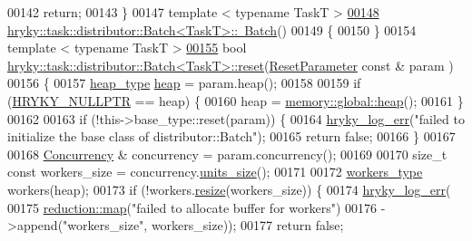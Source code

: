 \begin{DoxyCode}
00142     \textcolor{keywordflow}{return};
00143 \}
00147 \textcolor{keyword}{template} < \textcolor{keyword}{typename} TaskT >
\hypertarget{task__distributor__batch_8h_source_l00148}{}\hyperlink{group__task_ga80bd5c0c04972878c21bd5eda4c7d4e7}{00148} \hyperlink{classhryky_1_1task_1_1distributor_1_1_batch}{hryky::task::distributor::Batch<TaskT>::~Batch}()
00149 \{
00150 \}
00154 \textcolor{keyword}{template} < \textcolor{keyword}{typename} TaskT >
\hypertarget{task__distributor__batch_8h_source_l00155}{}\hyperlink{group__task_ga9ebf9038e6e40f583b3b26866e1f8131}{00155} \textcolor{keywordtype}{bool} \hyperlink{classhryky_1_1task_1_1distributor_1_1_batch}{hryky::task::distributor::Batch<TaskT>::reset}(\hyperlink{structhryky_1_1task_1_1distributor_1_1_base_1_1_reset_parameter}{ResetParameter} \textcolor{keyword}{const} & param
      )
00156 \{
00157     \hyperlink{classhryky_1_1memory_1_1heap_1_1_base}{heap_type} \hyperlink{namespacehryky_1_1memory_1_1global_a6fc6103f67c837aa0f39b359588409cd}{heap} = param.heap();
00158 
00159     \textcolor{keywordflow}{if} (\hyperlink{common_8h_a4cd4ac09cfcdbd6b30ee69afc156e210}{HRYKY_NULLPTR} == heap) \{
00160         heap = \hyperlink{namespacehryky_1_1memory_1_1global_a6fc6103f67c837aa0f39b359588409cd}{memory::global::heap}();
00161     \}
00162     
00163     \textcolor{keywordflow}{if} (!this->base\_type::reset(param)) \{
00164         \hyperlink{log__writer__common_8h_ae5ad3dabb33f594695ef40753cb78aad}{hryky_log_err}(\textcolor{stringliteral}{"failed to initialize the base class of
       distributor::Batch"});
00165         \textcolor{keywordflow}{return} \textcolor{keyword}{false};
00166     \}
00167     
00168     \hyperlink{classhryky_1_1task_1_1_concurrency}{Concurrency} & concurrency = param.concurrency();
00169 
00170     \textcolor{keywordtype}{size\_t} \textcolor{keyword}{const} workers\_size = concurrency.\hyperlink{classhryky_1_1task_1_1_concurrency_a2def26af9d687f558bbdb77f8c59f142}{units_size}();
00171 
00172     \hyperlink{classhryky_1_1_vector}{workers_type} workers(heap);
00173     \textcolor{keywordflow}{if} (!workers.\hyperlink{classhryky_1_1_vector_a9148eb8972b43ed3a7e807d19be848a5}{resize}(workers\_size)) \{
00174         \hyperlink{log__writer__common_8h_ae5ad3dabb33f594695ef40753cb78aad}{hryky_log_err}(
00175             \hyperlink{namespacehryky_1_1reduction_ac5eae270cf8047b294dc4ff3e5e11a79}{reduction::map}(\textcolor{stringliteral}{"failed to allocate buffer for workers"})
00176             ->append(\textcolor{stringliteral}{"workers\_size"}, workers\_size));
00177         \textcolor{keywordflow}{return} \textcolor{keyword}{false};

\end{DoxyCode}
